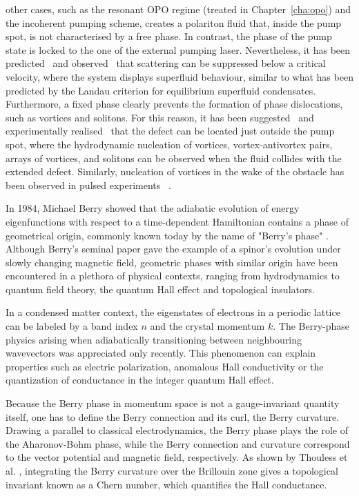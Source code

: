 other cases, such as the resonant OPO regime (treated in
Chapter~\ref{cha:opo}) and the incoherent pumping scheme, creates a
polariton fluid that, inside the pump spot, is not characterised by a
free phase. In contrast, the phase of the pump state is locked to the
one of the external pumping laser. Nevertheless, it has been
predicted~\cite{Carusotto_2004,Ciuti_2005} and
observed~\cite{Amo_2009} that scattering can be suppressed below a
critical velocity, where the system displays superfluid behaviour,
similar to what has been predicted by the Landau criterion for
equilibrium superfluid condensates. Furthermore, a fixed phase clearly
prevents the formation of phase dislocations, such as vortices and
solitons. For this reason, it has been suggested~\cite{Pigeon_2011}
and experimentally realised~\cite{Amo_2011} that the defect can be
located just outside the pump spot, where the hydrodynamic nucleation
of vortices, vortex-antivortex pairs, arrays of vortices, and solitons
can be observed when the fluid collides with the extended
defect. Similarly, nucleation of vortices in the wake of the obstacle
has been observed in pulsed experiments
~\cite{Nardin_2011,Sanvitto_2011}.
%

In 1984, Michael Berry showed that the adiabatic evolution of energy
eigenfunctions with respect to a time-dependent Hamiltonian contains a
phase of geometrical origin, commonly known today by the name of
"Berry's phase" \cite{Berry_1984}.  Although Berry's seminal paper gave
the example of a spinor's evolution under slowly changing magnetic
field, geometric phases \cite{shapere1989geometric} with similar
origin have been encountered in a plethora of physical contexts,
ranging from hydrodynamics to quantum field theory, the quantum Hall
effect and topological insulators.

In a condensed matter context, the eigenstates of electrons in a
periodic lattice can be labeled by a band index $n$ and the crystal
momentum $k$. The Berry-phase physics arising when adiabatically
transitioning between neighbouring wavevectors was appreciated only
recently. This phenomenon can explain properties such as electric
polarization, anomalous Hall conductivity or the quantization of
conductance in the integer quantum Hall effect.

Because the Berry phase in momentum space is not a gauge-invariant
quantity itself, one has to define the Berry connection and its curl,
the Berry curvature.  Drawing a parallel to classical electrodynamics,
the Berry phase plays the role of the Aharonov-Bohm phase, while the
Berry connection and curvature correspond to the vector potential and
magnetic field, respectively.  As shown by Thouless et
al. \cite{Thouless_1982}, integrating the Berry curvature over the
Brillouin zone gives a topological invariant known as a Chern number,
which quantifies the Hall conductance.

